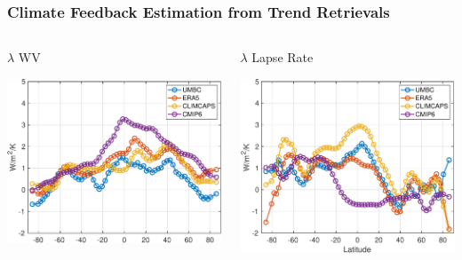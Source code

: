 \documentclass[10pt,t]{beamer}
\begin{document}
\begin{frame}
\frametitle{Climate Feedback Estimation from Trend Retrievals}  
  \vspace{-0.2in}
  \begin{columns}[T]
    \begin{column}{0.5\columnwidth}
      \begin{block}{\footnotesize \(\lambda\) WV}
        \vspace{-0.15in}
        \begin{center}
          \includegraphics[width=0.85\linewidth]{Figslls/wv_lambda.pdf}
        \end{center}
      \end{block}
    \end{column}


    \begin{column}{0.5\columnwidth}
      \begin{block}{\footnotesize \(\lambda\) Lapse Rate}
        \vspace{-0.15in}
        \begin{center}
          \includegraphics[width=0.85\linewidth]{Figslls/lapse_lambda.pdf}
        \end{center}
      \end{block}
    \end{column}
  \end{columns}


\end{frame}
\end{document}

